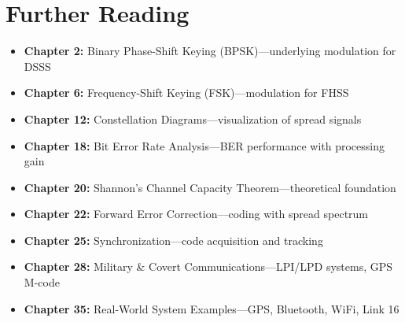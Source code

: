 \section{Further Reading}

\begin{itemize}
\item \textbf{Chapter 2:} Binary Phase-Shift Keying (BPSK)---underlying modulation for DSSS
\item \textbf{Chapter 6:} Frequency-Shift Keying (FSK)---modulation for FHSS
\item \textbf{Chapter 12:} Constellation Diagrams---visualization of spread signals
\item \textbf{Chapter 18:} Bit Error Rate Analysis---BER performance with processing gain
\item \textbf{Chapter 20:} Shannon's Channel Capacity Theorem---theoretical foundation
\item \textbf{Chapter 22:} Forward Error Correction---coding with spread spectrum
\item \textbf{Chapter 25:} Synchronization---code acquisition and tracking
\item \textbf{Chapter 28:} Military \& Covert Communications---LPI/LPD systems, GPS M-code
\item \textbf{Chapter 35:} Real-World System Examples---GPS, Bluetooth, WiFi, Link 16
\end{itemize}
